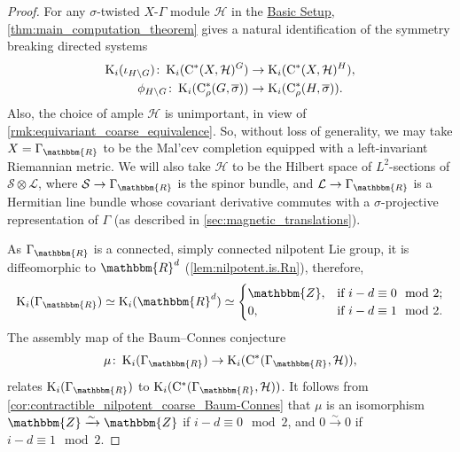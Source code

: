 \documentclass{amsart}
\numberwithin{figure}{section}
\numberwithin{equation}{section}
\numberwithin{table}{section}
\theoremstyle{plain}
\theoremstyle{definition}
\theoremstyle{remark}
\theoremstyle{nonumber}
\newcommand{\refbasicsetup}{\hyperref[basic_setup]{Basic Setup}}
\newcommand{\Z}{\mathbb{Z}}
\newcommand{\R}{\mathbb{R}}
\newcommand{\K}{\relax\ifmmode\operatorname{K}\else\textup{K}\fi}
\newcommand{\Cst}{\relax\ifmmode\mathrm{C}^*\else\textup{C*}\fi}
\newcommand{\Cstr}{\Cst_\rho} %
\renewcommand{\mathbb}{\mathbbm} %
\begin{document}
\begin{proof}
For any $\sigma$-twisted $X$-$\Gamma$ module $\mathcal{H}$ in the \refbasicsetup, \cref{thm:main_computation_theorem} gives a natural identification of the symmetry breaking directed systems
\begin{align*}
\K_i(\iota_{H\backslash G})\colon \K_i(\Cst(X,\mathcal{H})^G)&\to \K_i(\Cst(X,\mathcal{H})^H),\\
\phi_{H\backslash G}\colon \K_i(\Cstr(G,\overline{\sigma}))&\to \K_i(\Cstr(H,\overline{\sigma})).
\end{align*}
Also, the choice of ample $\mathcal{H}$ is unimportant, in view of \cref{rmk:equivariant_coarse_equivalence}. So, without loss of generality, we may take $X=\Gamma_\R$ to be the Mal'cev completion equipped with a left-invariant Riemannian metric. We will also take $\mathcal{H}$ to be the Hilbert space of $L^2$-sections of $\mathcal{S}\otimes \mathcal{L}$, where $\mathcal{S}\to \Gamma_\R$ is the spinor bundle, and $\mathcal{L}\to\Gamma_\R$ is a Hermitian line bundle whose covariant derivative commutes with a $\sigma$-projective representation of $\Gamma$ (as described in \cref{sec:magnetic_translations}).


As \( \Gamma_\R \) is a connected, simply connected nilpotent Lie group, it is diffeomorphic to $\R^d$ (\cref{lem:nilpotent.is.Rn}), therefore,
\[
  \K_i(\Gamma_\R)\simeq\K_i(\R^d)\simeq
  \begin{cases}
  \Z, & \text{if \( i-d\equiv 0\mod 2 \);} \\
  0, & \text{if \( i-d\equiv 1\mod 2 \).} 
  \end{cases}
\]
The assembly map of the Baum--Connes conjecture \cite{Higson-Roe:Coarse_Baum-Connes}
\begin{equation}\label{eq:BC.conjecture}
  \mu\colon \K_i(\Gamma_\R)\to\K_i(\Cst(\Gamma_\R,\mathcal{H})),
\end{equation}
relates $\K_i(\Gamma_\R)$ to $\K_i(\Cst(\Gamma_\R,\mathcal{H}))$.
It follows from \cref{cor:contractible_nilpotent_coarse_Baum-Connes} that
$\mu$ is an isomorphism $\Z\xrightarrow{\sim}\Z$ if $i-d\equiv 0\mod 2$, and \( 0\xrightarrow{\sim}0 \) if $i-d\equiv 1\mod 2$. 


\end{proof}
\end{document}
